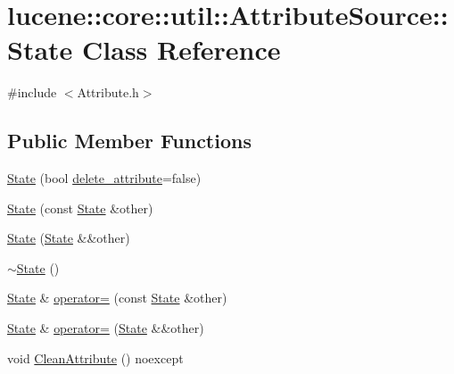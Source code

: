 \hypertarget{classlucene_1_1core_1_1util_1_1AttributeSource_1_1State}{}\section{lucene\+:\+:core\+:\+:util\+:\+:Attribute\+Source\+:\+:State Class Reference}
\label{classlucene_1_1core_1_1util_1_1AttributeSource_1_1State}


{\ttfamily \#include $<$Attribute.\+h$>$}

\subsection*{Public Member Functions}
\begin{DoxyCompactItemize}
\item 
\mbox{\hyperlink{classlucene_1_1core_1_1util_1_1AttributeSource_1_1State_a0a7ca16cd4c6897ed68f26ab0c5fbd98}{State}} (bool \mbox{\hyperlink{classlucene_1_1core_1_1util_1_1AttributeSource_1_1State_a295bd737041155f73ff62277a6937926}{delete\+\_\+attribute}}=false)
\item 
\mbox{\hyperlink{classlucene_1_1core_1_1util_1_1AttributeSource_1_1State_a79a00eace2edc19b09e909936623f876}{State}} (const \mbox{\hyperlink{classlucene_1_1core_1_1util_1_1AttributeSource_1_1State}{State}} \&other)
\item 
\mbox{\hyperlink{classlucene_1_1core_1_1util_1_1AttributeSource_1_1State_a8120f3909d194b9d892eeb3c2556cd72}{State}} (\mbox{\hyperlink{classlucene_1_1core_1_1util_1_1AttributeSource_1_1State}{State}} \&\&other)
\item 
\mbox{\hyperlink{classlucene_1_1core_1_1util_1_1AttributeSource_1_1State_a3a05101886b2a6734ded49d37fa149c2}{$\sim$\+State}} ()
\item 
\mbox{\hyperlink{classlucene_1_1core_1_1util_1_1AttributeSource_1_1State}{State}} \& \mbox{\hyperlink{classlucene_1_1core_1_1util_1_1AttributeSource_1_1State_ad44d92b62baa1db8c52bf961cec57863}{operator=}} (const \mbox{\hyperlink{classlucene_1_1core_1_1util_1_1AttributeSource_1_1State}{State}} \&other)
\item 
\mbox{\hyperlink{classlucene_1_1core_1_1util_1_1AttributeSource_1_1State}{State}} \& \mbox{\hyperlink{classlucene_1_1core_1_1util_1_1AttributeSource_1_1State_a836a42b767c7d71bd1fb4d18336d13f9}{operator=}} (\mbox{\hyperlink{classlucene_1_1core_1_1util_1_1AttributeSource_1_1State}{State}} \&\&other)
\item 
void \mbox{\hyperlink{classlucene_1_1core_1_1util_1_1AttributeSource_1_1State_aac9541c0dcefd6c907c9bddbed2eccba}{Clean\+Attribute}} () noexcept
\end{DoxyCompactItemize}
